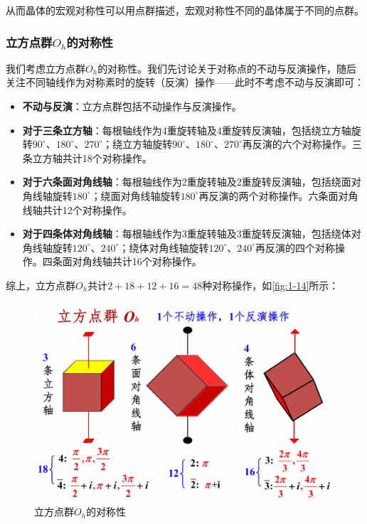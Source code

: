     从而晶体的宏观对称性可以用点群描述，宏观对称性不同的晶体属于不同的点群。

\subsubsection{立方点群$O_h$的对称性}
    我们考虑立方点群$O_h$的对称性。我们先讨论关于对称点的不动与反演操作，随后关注不同轴线作为对称素时的旋转（反演）操作——此时不考虑不动与反演即可：
    \begin{itemize}[itemsep=0pt,parsep=0pt]
        \item \textbf{不动与反演}：立方点群包括不动操作与反演操作。
        \item \textbf{对于三条立方轴}：每根轴线作为4重旋转轴及4重旋转反演轴，包括绕立方轴旋转$90^{\circ}$、$180^{\circ}$、$270^{\circ}$；绕立方轴旋转$90^{\circ}$、$180^{\circ}$、$270^{\circ}$再反演的六个对称操作。三条立方轴共计18个对称操作。
        \item \textbf{对于六条面对角线轴}：每根轴线作为2重旋转轴及2重旋转反演轴，包括绕面对角线轴旋转$180^{\circ}$；绕面对角线轴旋转$180^{\circ}$再反演的两个对称操作。六条面对角线轴共计12个对称操作。
        \item \textbf{对于四条体对角线轴}：每根轴线作为3重旋转轴及3重旋转反演轴，包括绕体对角线轴旋转$120^{\circ}$、$240^{\circ}$；绕体对角线轴旋转$120^{\circ}$、$240^{\circ}$再反演的四个对称操作。四条面对角线轴共计16个对称操作。
    \end{itemize}
    综上，立方点群$O_h$共计$2+18+12+16=48$种对称操作，如\autoref{fig:1-14}所示：

    \begin{figure}[!htbp]
        \centering    
        \includegraphics[height=20em, keepaspectratio=true]{pic/1-44}
        \caption{立方点群$O_h$的对称性}
        \label{fig:1-14}
    \end{figure}

